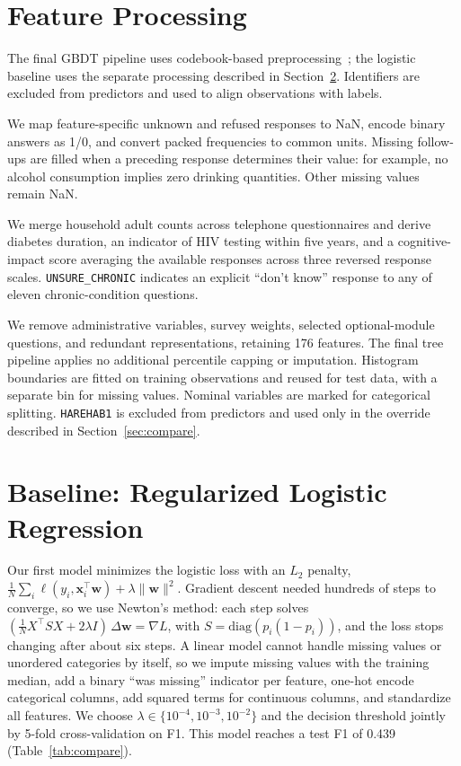 \documentclass[10pt,conference,compsocconf]{IEEEtran}
\begin{document}
\section{Feature Processing}
\label{sec:data}

The final GBDT pipeline uses codebook-based preprocessing~\cite{cdcBRFSS2015Codebook};
the logistic baseline uses the separate processing described
in Section~\ref{sec:linear}. Identifiers are excluded from
predictors and used to align observations with labels.

We map feature-specific unknown and refused responses to
NaN, encode binary answers as 1/0, and convert packed
frequencies to common units. Missing follow-ups are filled
when a preceding response determines their value: for example,
no alcohol consumption implies zero drinking quantities.
Other missing values remain NaN.

We merge household adult counts across telephone
questionnaires and derive diabetes duration, an indicator
of HIV testing within five years, and a cognitive-impact
score averaging the available responses across three reversed
response scales.
\texttt{UNSURE\_CHRONIC} indicates an explicit ``don't know''
response to any of eleven chronic-condition questions.

We remove administrative variables, survey weights, selected
optional-module questions, and redundant representations,
retaining 176 features. The final tree pipeline applies no
additional percentile capping or imputation. Histogram
boundaries are fitted on training observations and reused
for test data, with a separate bin for missing values.
Nominal variables are marked for categorical splitting.
\texttt{HAREHAB1} is excluded from predictors and used only
in the override described in Section~\ref{sec:compare}.



\section{Baseline: Regularized Logistic Regression}
\label{sec:linear}

Our first model minimizes the logistic loss with an $L_2$ penalty,
$\frac{1}{N}\sum_i \ell(y_i, \mathbf{x}_i^\top \mathbf{w}) + \lambda\|\mathbf{w}\|^2$.
Gradient descent needed hundreds of steps to converge, so we use Newton's method:
each step solves $(\frac{1}{N}X^\top S X + 2\lambda I)\,\Delta\mathbf{w} = \nabla L$,
with $S = \mathrm{diag}(p_i(1-p_i))$, and the loss stops changing after about six
steps. A linear model cannot handle missing values or unordered categories by
itself, so we impute missing values with the training median, add a binary
``was missing'' indicator per feature, one-hot encode categorical columns, add
squared terms for continuous columns, and standardize all features. We choose
$\lambda \in \{10^{-4}, 10^{-3}, 10^{-2}\}$ and the decision threshold jointly
by 5-fold cross-validation on F1. This model reaches a test F1 of 0.439
(Table~\ref{tab:compare}).
\end{document}
